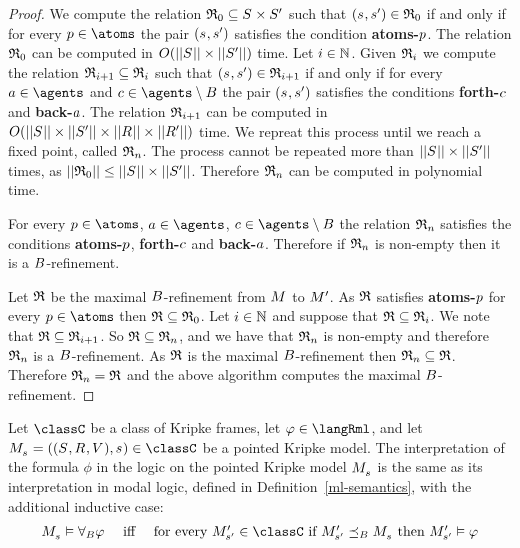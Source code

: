 \begin{proof}
We compute the relation $\refinement_0 \subseteq \kStates \times \kStatesP$ such that $(\kStateS, \kStateSP) \in \refinement_0$ if and only if for every $\atomP \in \atoms$ the pair $(\kStateS, \kStateSP)$ satisfies the condition {\bf atoms-$p$}.
The relation $\mathfrak{R}_0$ can be computed in $O(||\kStates|| \times ||\kStatesP||)$ time.
Let $i \in \mathbb{N}$.
Given $\mathfrak{R}_i$ we compute the relation $\mathfrak{R}_{i+1} \subseteq \mathfrak{R}_i$ such that $(\kStateS, \kStateSP) \in \refinement_{i+1}$ if and only if for every $\agentA \in \agents$ and $\agentC \in \agents \setminus \agentsB$ the pair $(\kStateS, \kStateSP)$ satisfies the conditions {\bf forth-$c$} and {\bf back-$a$}.
The relation $\mathfrak{R}_{i+1}$ can be computed in $O(||\kStates|| \times ||\kStatesP|| \times ||\kAccessibilityRel|| \times ||\kAccessibilityRelP||)$ time.
We repreat this process until we reach a fixed point, called $\mathfrak{R}_n$.
The process cannot be repeated more than $||\kStates|| \times ||\kStatesP||$ times, as $||\refinement_0|| \leq ||\kStates|| \times ||\kStatesP||$.
Therefore $\mathfrak{R}_n$ can be computed in polynomial time.

For every $\atomP \in \atoms$, $\agentA \in \agents$, $\agentC \in \agents \setminus \agentsB$ the relation $\mathfrak{R}_n$ satisfies the conditions {\bf atoms-$p$}, {\bf forth-$c$} and {\bf back-$a$}.
Therefore if $\mathfrak{R}_n$ is non-empty then it is a $B$-refinement.

Let $\mathfrak{R}$ be the maximal $B$-refinement from $\kModel$ to ${M^{\prime}_{}}$.
As $\mathfrak{R}$ satisfies {\bf atoms-$p$} for every $\atomP \in \atoms$ then $\mathfrak{R} \subseteq \mathfrak{R}_0$.
Let $i \in \mathbb{N}$ and suppose that $\mathfrak{R} \subseteq \mathfrak{R}_i$. 
We note that $\mathfrak{R} \subseteq \mathfrak{R}_{i + 1}$.
So $\mathfrak{R} \subseteq \mathfrak{R}_n$, and we have that $\mathfrak{R}_n$ is non-empty and therefore $\mathfrak{R}_n$ is a $B$-refinement.
As $\mathfrak{R}$ is the maximal $B$-refinement then $\mathfrak{R}_n \subseteq \mathfrak{R}$.
Therefore $\mathfrak{R}_n = \mathfrak{R}$ and the above algorithm computes the maximal $B$-refinement.
\end{proof}

\begin{definition}
Let $\classC$ be a class of Kripke frames, let $\phi \in \langRml$, and let $\kPModelAndTuple{\kStateS} \in \classC$ be a pointed Kripke model.
The interpretation of the formula $\phi$ in the logic \logicRmlC{} on the pointed Kripke model $\kPModel{\kStateS}$ is the same as its interpretation in modal logic, defined in Definition~\ref{ml-semantics}, with the additional inductive case:
$$
\begin{array}{lcl}
    \kPModel{\kStateS} \entails \allrefsBs \phi & \text{ iff } & \text{for every } \kPModelP{\kStateSP} \in \classC \text{ if } \kPModelP{\kStateSP} \refinesBs \kPModel{\kStateS} \text{ then } \kPModelP{\kStateSP} \entails \phi
\end{array}
$$
\end{definition}

